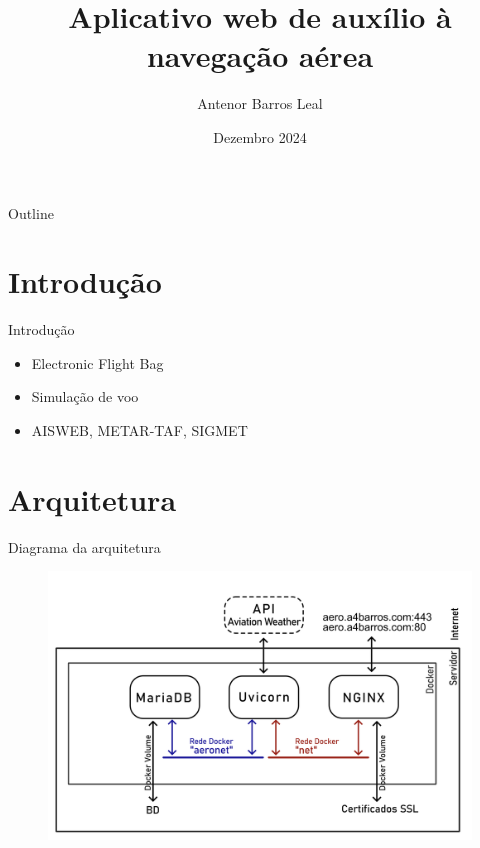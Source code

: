 \documentclass{beamer}
\title{Aplicativo web de auxílio à navegação aérea}
\author{Antenor Barros Leal}
\institute{Departamento de Informática \\ PUC-Rio}
\date{Dezembro 2024}
\begin{document}
\begin{frame}
    \titlepage
\end{frame}

\begin{frame}{Outline}
    \tableofcontents
\end{frame}

\section{Introdução}

\begin{frame}{Introdução}
    \begin{itemize}
        \item Electronic Flight Bag
        \item Simulação de voo
        \item AISWEB, METAR-TAF, SIGMET
    \end{itemize}
\end{frame}

\section{Arquitetura}

\begin{frame}{Diagrama da arquitetura}
    \begin{figure}[ht]
        \begin{center}
        \includegraphics[width=0.8\linewidth]{img/diagrama-arquitetura.png}
        \label{fig:arquitetura}
        \end{center}
    \end{figure}
\end{frame}
\end{document}
